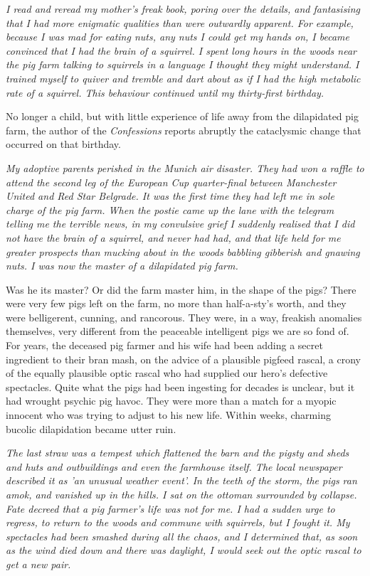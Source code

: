 \emph{I read and reread my mother's freak book, poring over the details, and fantasising that I had more enigmatic qualities than were outwardly apparent. For example, because I was mad for eating nuts, any nuts I could get my hands on, I became convinced that I had the brain of a squirrel. I spent long hours in the woods near the pig farm talking to squirrels in a language I thought they might understand. I trained myself to quiver and tremble and dart about as if I had the high metabolic rate of a squirrel. This behaviour continued until my thirty-first birthday.}

No longer a child, but with little experience of life away from the dilapidated pig farm, the author of the \emph{Confessions} reports abruptly the cataclysmic change that occurred on that birthday.

\emph{My adoptive parents perished in the Munich air disaster. They had won a raffle to attend the second leg of the European Cup quarter-final between Manchester United and Red Star Belgrade. It was the first time they had left me in sole charge of the pig farm. When the postie came up the lane with the telegram telling me the terrible news, in my convulsive grief I suddenly realised that I did not have the brain of a squirrel, and never had had, and that life held for me greater prospects than mucking about in the woods babbling gibberish and gnawing nuts. I was now the master of a dilapidated pig farm.}

Was he its master? Or did the farm master him, in the shape of the pigs? There were very few pigs left on the farm, no more than half-a-sty's worth, and they were belligerent, cunning, and rancorous. They were, in a way, freakish anomalies themselves, very different from the peaceable intelligent pigs we are so fond of. For years, the deceased pig farmer and his wife had been adding a secret ingredient to their bran mash, on the advice of a plausible pigfeed rascal, a crony of the equally plausible optic rascal who had supplied our hero's defective spectacles. Quite what the pigs had been ingesting for decades is unclear, but it had wrought psychic pig havoc. They were more than a match for a myopic innocent who was trying to adjust to his new life. Within weeks, charming bucolic dilapidation became utter ruin.

\emph{The last straw was a tempest which flattened the barn and the pigsty and sheds and huts and outbuildings and even the farmhouse itself. The local newspaper described it as 'an unusual weather event'. In the teeth of the storm, the pigs ran amok, and vanished up in the hills. I sat on the ottoman surrounded by collapse. Fate decreed that a pig farmer's life was not for me. I had a sudden urge to regress, to return to the woods and commune with squirrels, but I fought it. My spectacles had been smashed during all the chaos, and I determined that, as soon as the wind died down and there was daylight, I would seek out the optic rascal to get a new pair.}

